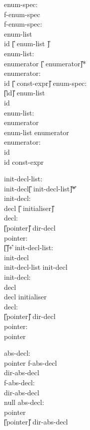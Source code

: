 \begin{center}
\PAIR
{
enum-spec:\\
\>	 f-enum-spec\\
f-enum-spec:\\
\>	\T{\{} enum-list \T{\}}\\
\>	id \U{[}\T{\{} enum-list \T{\}}\U{]}\\
enum-list:\\
\>	enumerator \U{[}\T{,} enumerator\U{]}*\\
enumerator:\\
\>	id \U{[}\T{=} const-expr\U{]}
}
{
enum-spec:\\
\>	 \U{[}id\U{]} \T{\{}enum-list\T{\}}\\
\>	 id\\
enum-list:\\
\>	enumerator\\
\>	enum-list \T{,} enumerator\\
enumerator:\\
\>	id\\
\>	id \T{=} const-expr
}


\PAIR 
{
init-decl-list: \\
\>	init-decl\U{[}\T{,} init-decl-list\U{]}\U{*}\\
init-decl: \\
\>	decl \U{[}\T{=} initialiser\U{]} \\
decl: \\  
\>	\U{[}pointer\U{]} dir-decl \\
pointer: \\ 
\>	\U{[}\T{*}\U{]}\U{+}
}
{
init-decl-list: \\
\>	init-decl \\
\>	init-decl-list \T{,} init-decl \\
init-decl: \\
\>	decl \\
\>	decl \T{=} initialiser \\
decl: \\
\>	\U{[}pointer\U{]} dir-decl \\
pointer: \\
\>	\T{*} pointer 
}


\PAIR
{ 
abs-decl:\\
\>	pointer f-abs-decl\\
\>	dir-abs-decl\\
f-abs-decl: \\
\>	dir-abs-decl\\
\>	null 
}
{
abs-decl:\\
\>	pointer\\
\>	\U{[}pointer\U{]} dir-abs-decl
}


\end{center}
